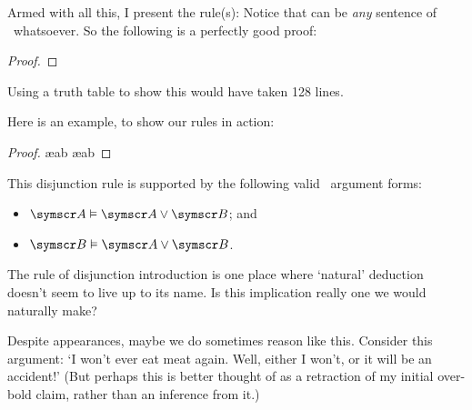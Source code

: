 Armed with all this, I present the  rule(s):
Notice that  can be \emph{any} sentence of \TFL\ whatsoever. So the following is a perfectly good proof:
\begin{proof}
\end{proof}
Using a truth table to show this would have taken 128 lines. 

Here is an example, to show our rules in action: \begin{proof}
	\ae{ab}
	\ae{ab}
\end{proof}

This disjunction rule is supported by the following valid \TFL\ argument forms: \begin{itemize}
	\item $\meta{A}\vDash\meta{A}\eor\meta{B}$; and 
	\item $\meta{B}\vDash\meta{A}\eor\meta{B}$.
\end{itemize}


The rule of disjunction introduction is one place where `natural' deduction doesn't seem to live up to its name. Is this implication really one we would naturally make?

Despite appearances, maybe we do sometimes reason like this. Consider this argument: `I won't ever eat meat again. Well, either I won't, or it will be an accident!' (But perhaps this is better thought of as a retraction of my initial over-bold claim, rather than an inference from it.)

